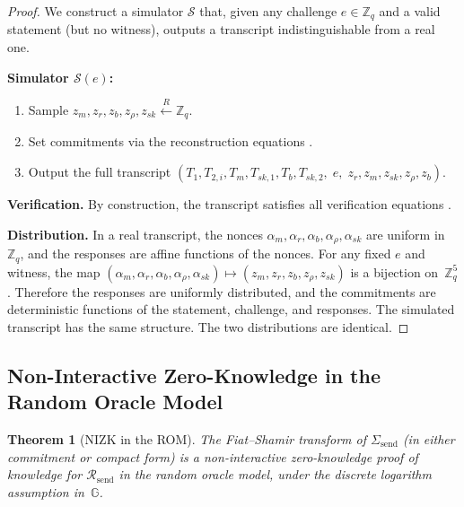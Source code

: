 \documentclass[11pt]{article}
\newtheorem{theorem}{Theorem}[section]
\theoremstyle{definition}
\newcommand{\G}{\mathbb{G}}
\newcommand{\Zq}{\mathbb{Z}_q}
\newcommand{\sk}{\mathit{sk}}
\begin{document}
\begin{proof}
  We construct a simulator $\mathcal{S}$ that, given any challenge
  $e \in \Zq$ and a valid statement (but no witness), outputs a
  transcript indistinguishable from a real one.

  \medskip\noindent\textbf{Simulator $\mathcal{S}(e)$:}
  \begin{enumerate}
    \item Sample $z_m, z_r, z_b, z_\rho, z_{\sk}
          \xleftarrow{\;R\;} \Zq$.
    \item Set commitments via the reconstruction equations
          .
    \item Output the full transcript
          $(T_1, T_{2,i}, T_m, T_{\sk,1}, T_b, T_{\sk,2},\;
            e,\; z_r, z_m, z_{\sk}, z_\rho, z_b)$.
  \end{enumerate}

  \medskip\noindent\textbf{Verification.}
  By construction, the transcript satisfies all verification equations
  .

  \medskip\noindent\textbf{Distribution.}
  In a real transcript, the nonces
  $\alpha_m, \alpha_r, \alpha_b, \alpha_\rho, \alpha_{\sk}$
  are uniform in~$\Zq$, and the responses are affine functions
  of the nonces.
  For any fixed $e$ and witness, the map
  $(\alpha_m, \alpha_r, \alpha_b, \alpha_\rho, \alpha_{\sk})
   \mapsto (z_m, z_r, z_b, z_\rho, z_{\sk})$
  is a bijection on~$\Zq^5$.
  Therefore the responses are uniformly distributed, and the
  commitments are deterministic functions of the statement, challenge,
  and responses.
  The simulated transcript has the same structure.
  The two distributions are identical.
\end{proof}

\subsection{Non-Interactive Zero-Knowledge in the Random Oracle Model}

\begin{theorem}[NIZK in the ROM]
  \label{thm:nizk}
  The Fiat--Shamir transform of $\Sigma_{\mathrm{send}}$
  (in either commitment or compact form) is a non-interactive
  zero-knowledge proof of knowledge for $\mathcal{R}_{\mathrm{send}}$
  in the random oracle model, under the discrete logarithm assumption
  in~$\G$.
\end{theorem}
\end{document}
